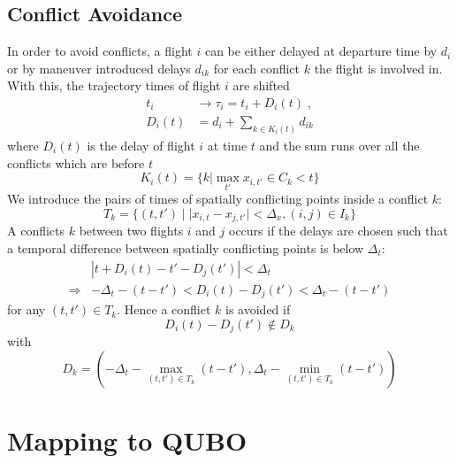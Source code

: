 \documentclass[aps,pra,twocolumn,10pt]{revtex4-1}
\begin{document}
\subsection{Conflict Avoidance}
In order to avoid conflicts, a flight $i$ can be either delayed at departure time by $d_i$ or by maneuver introduced delays $d_{ik}$ for each conflict $k$ the flight is involved in.
With this, the trajectory times of flight $i$ are shifted
\begin{align*}
    t_i & \to \tau_i = t_i  + D_i(t) \; , \\
    D_i(t) & = d_i + \sum_{k\in K_{i}(t)} d_{ik} 
\end{align*}
where $D_i(t)$ is the delay of flight $i$ at time $t$ and the sum runs over all the conflicts which are before $t$
\begin{equation*}
    K_{i}(t) = \{k | \max_{t'} x_{i,t'} \in C_k < t   \} 
\end{equation*}
We introduce the pairs of times of spatially conflicting points inside a conflict $k$:
\begin{equation*}
    T_k =  \{(t, t') \; | \; |x_{i, t} - x_{j, t'}| < \Delta_x, (i, j) \in I_k \}
\end{equation*}
A conflicts $k$ between two flights $i$ and $j$ occurs if the delays are chosen such that a temporal difference between spatially conflicting points is below $\Delta_t$:
\begin{align*}
    & |t + D_i(t) - t' - D_j(t')| < \Delta_t \\
    \Rightarrow  & - \Delta_t - (t - t') < D_i(t) - D_j(t') < \Delta_t - (t - t')
\end{align*}
for any $(t, t') \in T_k$.
Hence a conflict $k$ is avoided if
\begin{equation*}
    D_i(t) - D_j(t') \notin D_k
\end{equation*}
with
\begin{equation*}
    D_k = \left(-\Delta_t - \max_{(t, t') \in T_k} (t - t'), \Delta_t - \min_{(t, t') \in T_k} (t - t')\right)
\end{equation*}
\section{Mapping to QUBO}



\end{document}
